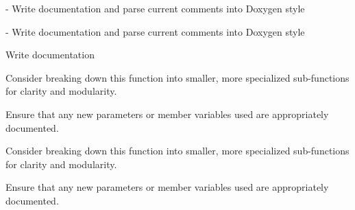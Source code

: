 \begin{DoxyRefList}
%
-\/ Write documentation and parse current comments into Doxygen style  
\item[Member \mbox{\hyperlink{classm_d_o_m_harness_aa192aa85786a58ad121567fbb7a78f06}{m\+DOMHarness\+::m\+DOMHarness}} (\mbox{\hyperlink{classm_d_o_m}{m\+DOM}} $\ast$p\+MDOM, \mbox{\hyperlink{class_input_data_manager}{Input\+Data\+Manager}} $\ast$p\+Data)]\label{todo__todo000008}%
%
-\/ Write documentation and parse current comments into Doxygen style  
\item[File \mbox{\hyperlink{_o_m_sim_d_e_g_g_harness_8hh}{OMSim\+DEGGHarness.hh}} ]\label{todo__todo000003}%
%
Write documentation


\item[Member \mbox{\hyperlink{class_o_m_sim_e_n_e_s_a96fd869fd3ad49f3fa502708d44d414c}{OMSim\+ENES\+::Generate\+Primaries}} (G4\+Event $\ast$an\+Event)]\label{todo__todo000009}%
%
Consider breaking down this function into smaller, more specialized sub-\/functions for clarity and modularity. 

Ensure that any new parameters or member variables used are appropriately documented.  
\item[Member \mbox{\hyperlink{class_o_m_sim_i_b_d_a50ac39b481be2a879c73f94e201ef6da}{OMSim\+IBD\+::Generate\+Primaries}} (G4\+Event $\ast$an\+Event)]\label{todo__todo000010}%
%
Consider breaking down this function into smaller, more specialized sub-\/functions for clarity and modularity. 

Ensure that any new parameters or member variables used are appropriately documented. 


\end{DoxyRefList}
